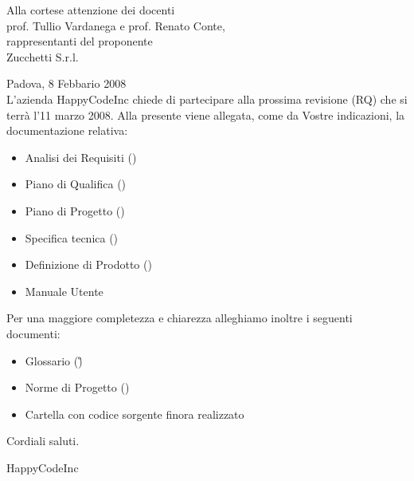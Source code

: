 


\newcommand{\dt}{ Lettera di accompagnamento }%




\thispagestyle{plain}
\begin{flushright}
Alla cortese attenzione dei docenti\\
prof. Tullio Vardanega e prof. Renato Conte,\\
rappresentanti del proponente\\
Zucchetti S.r.l.
\end{flushright}
Padova, 8 Febbario 2008 \\

L'azienda HappyCodeInc chiede di partecipare alla prossima revisione (RQ) che si terr\`a l'11 marzo 2008.
Alla presente viene allegata, come da Vostre indicazioni, la documentazione relativa:
\begin{itemize}
\item{}Analisi dei Requisiti (\AR)
\item{}Piano di Qualifica (\PdQ)
\item{}Piano di Progetto (\PdP)
\item{}Specifica tecnica (\ST) 
\item{}Definizione di Prodotto (\DdP)
\item{}Manuale Utente
\end{itemize}
Per una maggiore completezza e chiarezza alleghiamo inoltre i seguenti documenti:
\begin{itemize}
\item{}Glossario (\G)
\item{}Norme di Progetto (\NdP)
\item{}Cartella con codice sorgente finora realizzato
\end{itemize}
Cordiali saluti.
\begin{flushright}
HappyCodeInc
\end{flushright}
\newpage


